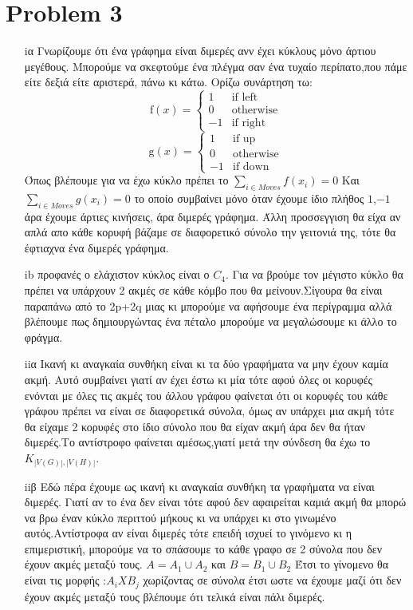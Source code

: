 \documentclass{article}
\begin{document}
\section*{Problem 3}
\begin{enumerate}
\item[iα]Γνωρίζουμε ότι ένα γράφημα είναι διμερές ανν έχει κύκλους μόνο άρτιου μεγέθους. Μπορούμε να σκεφτούμε ένα πλέγμα σαν ένα τυχαίο περίπατο,που πάμε είτε δεξιά είτε αριστερά, πάνω κι κάτω. Ορίζω συνάρτηση τω:\[
\mbox{f}(x)=\left\{
\begin{array}{rl}
1 & \mbox{if left} \\
0 & \mbox{otherwise} \\
-1 & \mbox{if right}
\end{array} \right.
\] 
\[
\mbox{g}(x)=\left\{
\begin{array}{rl}
1 & \mbox{if up} \\
0 & \mbox{otherwise} \\
-1 & \mbox{if down}
\end{array} \right.
\] 
Όπως βλέπουμε για να έχω κύκλο πρέπει το $\sum_{i\in Moves} f(x_i)=0$ Και $\sum_{i\in Moves} g(x_i)=0$ το οποίο συμβαίνει μόνο όταν έχουμε ίδιο πλήθος $1$,$-1$ άρα έχουμε άρτιες κινήσεις, άρα διμερές γράφημα. Άλλη προσσεγγιση θα είχα αν απλά απο κάθε κορυφή βάζαμε σε διαφορετικό σύνολο την γειτονιά της, τότε θα έφτιαχνα ένα διμερές γράφημα.
\item[ib] προφανές ο ελάχιστον κύκλος είναι ο $C_4$. Για να βρούμε τον μέγιστο κύκλο θα πρέπει να υπάρχουν 2 ακμές σε κάθε κόμβο που θα μείνουν.Σίγουρα θα είναι παραπάνω από το 2p+2q μιας κι μπορούμε να αφήσουμε ένα περίγραμμα αλλά βλέπουμε πως δημιουργώντας ένα πέταλο μπορούμε να μεγαλώσουμε κι άλλο το φράγμα.
\item[iiα]
Ικανή κι αναγκαία συνθήκη είναι κι τα δύο γραφήματα να μην έχουν καμία ακμή. Αυτό συμβαίνει γιατί αν έχει έστω κι μία τότε αφού όλες οι κορυφές ενόνται με όλες τις ακμές του άλλου γράφου φαίνεται ότι οι κορυφές του κάθε γράφου πρέπει να είναι σε διαφορετικά σύνολα, όμως αν υπάρχει μια ακμή τότε θα είχαμε 2 κορυφές στο ίδιο σύνολο που θα είχαν ακμή άρα δεν θα ήταν διμερές.Το αντίστροφο φαίνεται αμέσως,γιατί μετά την σύνδεση θα έχω το $K_{|V(G)|,|V(H)|}$.
\item[iiβ]
Εδώ πέρα έχουμε ως ικανή κι αναγκαία συνθήκη τα γραφήματα να είναι διμερές. Γιατί αν το ένα δεν είναι τότε αφού δεν αφαιρείται καμιά ακμή θα μπορώ να βρω έναν κύκλο περιττού μήκους κι να υπάρχει κι στο γινωμένο αυτός.Αντίστροφα αν είναι διμερές τότε επειδή ισχυεί το γινόμενο κι η επιμεριστική, μπορούμε να το σπάσουμε το κάθε γραφο σε 2 σύνολα που δεν έχουν ακμές μεταξύ τους. $A=A_1 \cup A_2$ και $B=B_1 \cup B_2$ Έτσι το γίνομενο θα είναι τις μορφής :$A_i X B_j$ χωρίζοντας σε σύνολα έτσι ωστε να έχουμε μαζί ότι δεν έχουν ακμές μεταξύ τους βλέπουμε ότι τελικά είναι πάλι διμερές.
\end{enumerate}
\end{document}
